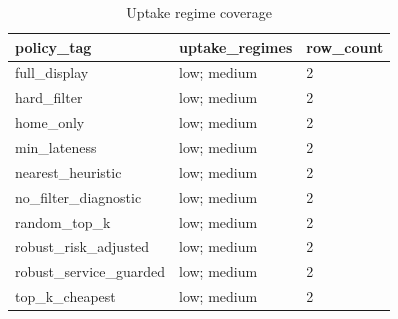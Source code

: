\begin{table}[ht]
\centering
\begin{tabular}{lll}
 \hline
policy\_tag & uptake\_regimes & row\_count \\
 \hline
full\_display & low; medium & 2 \\
hard\_filter & low; medium & 2 \\
home\_only & low; medium & 2 \\
min\_lateness & low; medium & 2 \\
nearest\_heuristic & low; medium & 2 \\
no\_filter\_diagnostic & low; medium & 2 \\
random\_top\_k & low; medium & 2 \\
robust\_risk\_adjusted & low; medium & 2 \\
robust\_service\_guarded & low; medium & 2 \\
top\_k\_cheapest & low; medium & 2 \\
 \hline
\end{tabular}
\caption{Uptake regime coverage}
\end{table}
